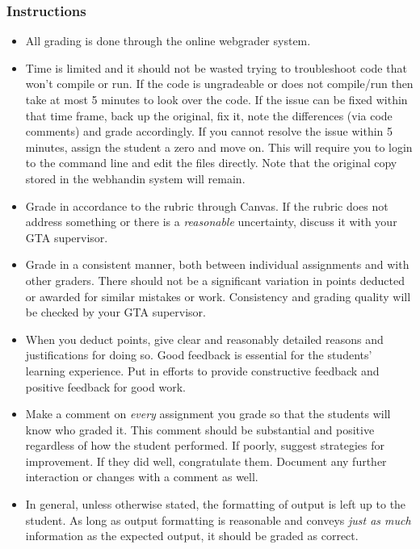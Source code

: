 \documentclass[12pt]{scrartcl}
\begin{document}
\subsubsection*{Instructions}

\begin{itemize}
  \item All grading is done through the online webgrader system.  
  \item Time is limited and it should not be wasted trying to troubleshoot 
    code that won't compile or run.  If the code is ungradeable or does not
    compile/run then take at most 5 minutes to look over
    the code.  If the issue can be fixed within that time frame, back up the
    original, fix it, note the differences (via code comments) and grade 
    accordingly.  If you cannot resolve the issue within 5 minutes, assign
    the student a zero and move on.  This will require you to login to the
    command line and edit the files directly.  Note that the original copy
    stored in the webhandin system will remain.
  \item Grade in accordance to the rubric through Canvas.  If the rubric 
    does not address something or there is a \emph{reasonable} uncertainty, 
    discuss it with your GTA supervisor.
  \item Grade in a consistent manner, both between individual assignments and
    with other graders.  There should not be a significant variation in
    points deducted or awarded for similar mistakes or work.  Consistency 
    and grading quality will be checked by your GTA supervisor.
  \item When you deduct points, give clear and reasonably detailed reasons
    and justifications for doing so.  Good feedback is essential for the
    students' learning experience.  Put in efforts to provide constructive
    feedback and positive feedback for good work.
  \item Make a comment on \emph{every} assignment you grade so that the students
    will know who graded it.  This comment should be substantial and positive 
    regardless of how the student performed.  If poorly, suggest strategies 
    for improvement.  If they did well, congratulate them.  Document any further
    interaction or changes with a comment as well.
  \item In general, unless otherwise stated, the formatting of output is
    left up to the student.  As long as output formatting is reasonable and
    conveys \emph{just as much} information as the expected output, it should
    be graded as correct.
\end{itemize}
\end{document}

